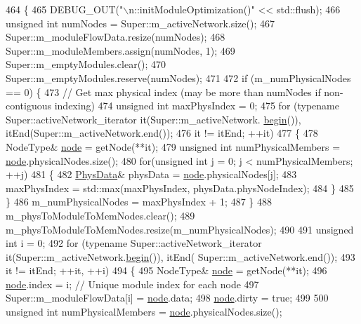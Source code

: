 \begin{DoxyCode}
464 \{
465     DEBUG\_OUT(\textcolor{stringliteral}{"\(\backslash\)n::initModuleOptimization()"} << std::flush);
466     \textcolor{keywordtype}{unsigned} \textcolor{keywordtype}{int} numNodes = Super::m\_activeNetwork.size();
467     Super::m\_moduleFlowData.resize(numNodes);
468     Super::m\_moduleMembers.assign(numNodes, 1);
469     Super::m\_emptyModules.clear();
470     Super::m\_emptyModules.reserve(numNodes);
471 
472     \textcolor{keywordflow}{if} (m\_numPhysicalNodes == 0) \{
473         \textcolor{comment}{// Get max physical index (may be more than numNodes if non-contiguous indexing)}
474         \textcolor{keywordtype}{unsigned} \textcolor{keywordtype}{int} maxPhysIndex = 0;
475         \textcolor{keywordflow}{for} (\textcolor{keyword}{typename} Super::activeNetwork\_iterator it(Super::m\_activeNetwork.
      \mbox{\hyperlink{namespacebegin}{begin}}()), itEnd(Super::m\_activeNetwork.end());
476                 it != itEnd; ++it)
477         \{
478             NodeType& \mbox{\hyperlink{structnode}{node}} = getNode(**it);
479             \textcolor{keywordtype}{unsigned} \textcolor{keywordtype}{int} numPhysicalMembers = \mbox{\hyperlink{structnode}{node}}.physicalNodes.size();
480             \textcolor{keywordflow}{for}(\textcolor{keywordtype}{unsigned} \textcolor{keywordtype}{int} j = 0; j < numPhysicalMembers; ++j)
481             \{
482                 \mbox{\hyperlink{structPhysData}{PhysData}}& physData = \mbox{\hyperlink{structnode}{node}}.physicalNodes[j];
483                 maxPhysIndex = std::max(maxPhysIndex, physData.physNodeIndex);
484             \}
485         \}
486         m\_numPhysicalNodes = maxPhysIndex + 1;
487     \}
488     m\_physToModuleToMemNodes.clear();
489     m\_physToModuleToMemNodes.resize(m\_numPhysicalNodes);
490 
491     \textcolor{keywordtype}{unsigned} \textcolor{keywordtype}{int} i = 0;
492     \textcolor{keywordflow}{for} (\textcolor{keyword}{typename} Super::activeNetwork\_iterator it(Super::m\_activeNetwork.\mbox{\hyperlink{namespacebegin}{begin}}()), itEnd(
      Super::m\_activeNetwork.end());
493             it != itEnd; ++it, ++i)
494     \{
495         NodeType& \mbox{\hyperlink{structnode}{node}} = getNode(**it);
496         \mbox{\hyperlink{structnode}{node}}.index = i; \textcolor{comment}{// Unique module index for each node}
497         Super::m\_moduleFlowData[i] = \mbox{\hyperlink{structnode}{node}}.data;
498         \mbox{\hyperlink{structnode}{node}}.dirty = \textcolor{keyword}{true};
499 
500         \textcolor{keywordtype}{unsigned} \textcolor{keywordtype}{int} numPhysicalMembers = \mbox{\hyperlink{structnode}{node}}.physicalNodes.size();

\end{DoxyCode}

